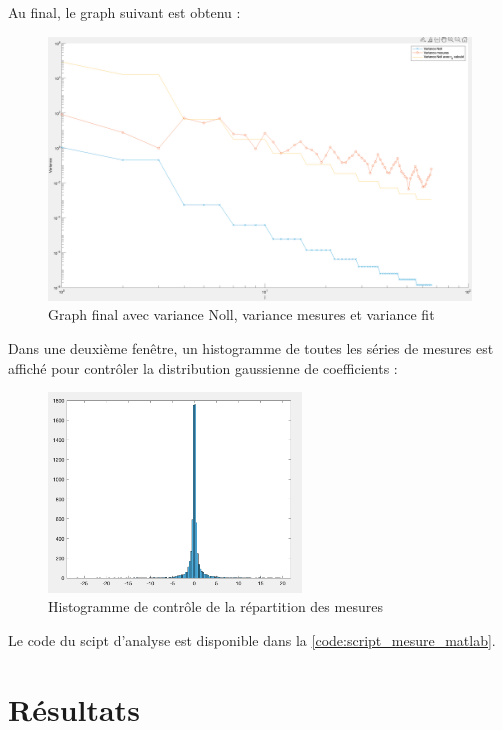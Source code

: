 \newpage
Au final, le graph suivant est obtenu :
\begin{figure}[H]
  \centering
  \includegraphics[width = 1\textwidth]{assets/figures/mesures/Plot_final_avec_fit.png}
  \caption{Graph final avec variance Noll, variance mesures et variance fit}
\end{figure}

Dans une deuxième fenêtre, un histogramme de toutes les séries de mesures est affiché pour contrôler la distribution gaussienne de coefficients :
\begin{figure}[H]
  \centering
  \includegraphics[width = 0.6\textwidth]{assets/figures/mesures/histogramme_mesure.png}
  \caption{Histogramme de contrôle de la répartition des mesures}
\end{figure}

Le code du scipt d'analyse est disponible dans la \autoref{code:script_mesure_matlab}.

\newpage
\section{Résultats}